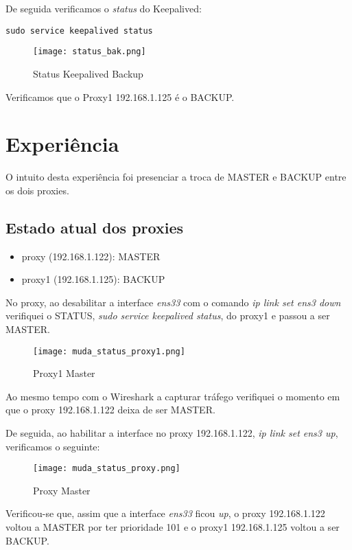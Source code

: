 De seguida verificamos o \textit{status} do Keepalived:
\begin{verbatim}sudo service keepalived status\end{verbatim}

\begin{figure}[H]
\center
\texttt{[image: status\_bak.png]}
\caption{Status Keepalived Backup}
\end{figure}

Verificamos que o Proxy1 192.168.1.125 é o BACKUP.

\newpage
\section{Experiência}
O intuito desta experiência foi presenciar a troca de MASTER e BACKUP entre os dois proxies.  
\subsection{Estado atual dos proxies}
\begin{itemize}
    \item proxy (192.168.1.122): MASTER
    \item proxy1 (192.168.1.125): BACKUP
\end{itemize}

No proxy, ao desabilitar a interface \textit{ens33} com o comando \textit{ip link set ens3 down} verifiquei o STATUS, \textit{sudo service keepalived status}, do proxy1 e passou a ser MASTER.

\begin{figure}[H]
\center
\texttt{[image: muda\_status\_proxy1.png]}
\caption{Proxy1 Master}
\end{figure}

Ao mesmo tempo com o Wireshark a capturar tráfego verifiquei o momento em que o proxy 192.168.1.122 deixa de ser MASTER.

De seguida, ao habilitar a interface no proxy 192.168.1.122, \textit{ip link set ens3 up}, verificamos o seguinte:

\begin{figure}[H]
\center
\texttt{[image: muda\_status\_proxy.png]}
\caption{Proxy Master}
\end{figure}

\newpage
Verificou-se que, assim que a interface \textit{ens33} ficou \textit{up}, o proxy 192.168.1.122 voltou a MASTER por ter prioridade 101 e o proxy1 192.168.1.125 voltou a ser BACKUP.


